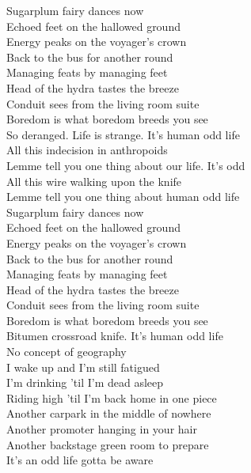 Sugarplum fairy dances now \\
Echoed feet on the hallowed ground \\
Energy peaks on the voyager's crown \\
Back to the bus for another round \\
Managing feats by managing feet \\
Head of the hydra tastes the breeze \\
Conduit sees from the living room suite \\
Boredom is what boredom breeds you see \\

So deranged. Life is strange. It's human odd life \\

All this indecision in anthropoids \\
Lemme tell you one thing about our life. It's odd \\
All this wire walking upon the knife \\
Lemme tell you one thing about human odd life \\

Sugarplum fairy dances now \\
Echoed feet on the hallowed ground \\
Energy peaks on the voyager's crown \\
Back to the bus for another round \\
Managing feats by managing feet \\
Head of the hydra tastes the breeze \\
Conduit sees from the living room suite \\
Boredom is what boredom breeds you see \\

Bitumen crossroad knife. It's human odd life \\

No concept of geography \\
I wake up and I'm still fatigued \\
I'm drinking 'til I'm dead asleep \\
Riding high 'til I'm back home in one piece \\
Another carpark in the middle of nowhere \\
Another promoter hanging in your hair \\
Another backstage green room to prepare \\
It's an odd life gotta be aware \\


